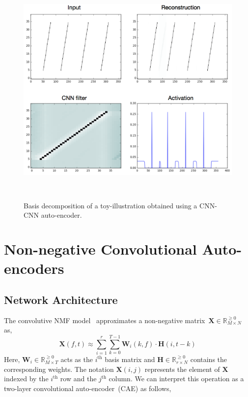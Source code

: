 \documentclass{article}
\begin{document}
\begin{figure}[t]
\centering
  \includegraphics[clip, trim = 0cm 0cm 0cm 0cm, width=\linewidth]{Figs/CNN_demo.png}
  \caption{Basis decomposition of a toy-illustration obtained using a CNN-CNN auto-encoder.}~\label{fig:cnn_demo}
\end{figure}

\section{Non-negative Convolutional Auto-encoders}
\subsection{Network Architecture}
\label{sec:conv-nmf}
The convolutive NMF model~\cite{smaragdis2007convolutive} approximates a non-negative matrix~$\mathbf{X}\in \mathbb{R}_{M \times N}^{\geq0}$ as,
\begin{equation}
    \mathbf{X}(f,t) \approx \sum_{i=1}^{r} \sum_{k=0}^{T-1} \mathbf{W}_{i}(k,f)\cdot\mathbf{H}(i,t-k)
\end{equation}
Here, $\mathbf{W}_{i} \in \mathbb{R}_{M \times T}^{\geq0}$ acts as the $i^{\text{th}}$ basis matrix and $\mathbf{H} \in \mathbb{R}_{r \times N}^{\geq0}$ contains the corresponding weights. The notation $\mathbf{X}(i,j)$ represents the element of $\mathbf{X}$ indexed by the $i^{\text{th}}$ row and the $j^{\text{th}}$ column. We can interpret this operation as a two-layer convolutional auto-encoder~(CAE) as follows,
\end{document}
